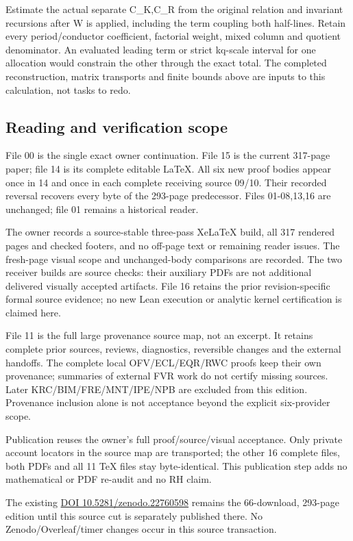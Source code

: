 \documentclass[
]{article}
\begin{document}
Estimate the actual separate C\_K,C\_R from the original relation and
invariant recursions after W is applied, including the term coupling
both half-lines. Retain every period/conductor coefficient, factorial
weight, mixed column and quotient denominator. An evaluated leading term
or strict kq-scale interval for one allocation would constrain the other
through the exact total. The completed reconstruction, matrix transports
and finite bounds above are inputs to this calculation, not tasks to
redo.

\subsection{Reading and verification
scope}\label{reading-and-verification-scope}

File 00 is the single exact owner continuation. File 15 is the current
317-page paper; file 14 is its complete editable LaTeX. All six new
proof bodies appear once in 14 and once in each complete receiving
source 09/10. Their recorded reversal recovers every byte of the
293-page predecessor. Files 01-08,13,16 are unchanged; file 01 remains a
historical reader.

The owner records a source-stable three-pass XeLaTeX build, all 317
rendered pages and checked footers, and no off-page text or remaining
reader issues. The fresh-page visual scope and unchanged-body
comparisons are recorded. The two receiver builds are source checks:
their auxiliary PDFs are not additional delivered visually accepted
artifacts. File 16 retains the prior revision-specific formal source
evidence; no new Lean execution or analytic kernel certification is
claimed here.

File 11 is the full large provenance source map, not an excerpt. It
retains complete prior sources, reviews, diagnostics, reversible changes
and the external handoffs. The complete local OFV/ECL/EQR/RWC proofs
keep their own provenance; summaries of external FVR work do not certify
missing sources. Later KRC/BIM/FRE/MNT/IPE/NPB are excluded from this
edition. Provenance inclusion alone is not acceptance beyond the
explicit six-provider scope.

Publication reuses the owner's full proof/source/visual acceptance. Only
private account locators in the source map are transported; the other 16
complete files, both PDFs and all 11 TeX files stay byte-identical. This
publication step adds no mathematical or PDF re-audit and no RH claim.

The existing \href{https://doi.org/10.5281/zenodo.22760598}{DOI
10.5281/zenodo.22760598} remains the 66-download, 293-page edition until
this source cut is separately published there. No Zenodo/Overleaf/timer
changes occur in this source transaction.
\end{document}
